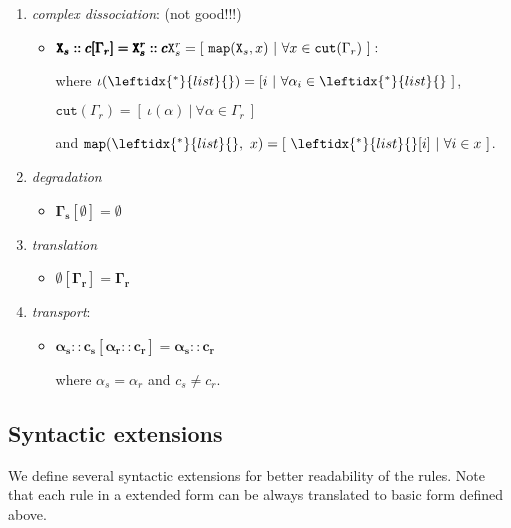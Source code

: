 \documentclass{entcs}
\renewcommand{\~}[0]{\texttildelow}
\begin{document}
\begin{definition}
\begin{enumerate}
\begin{itemize}
\end{itemize}

\item \textit{complex dissociation}: (not good!!!)

\begin{itemize}
\item $ \pmb{\mathtt{X}_s::c[\Gamma_r] = \mathtt{X}^r_s::c} \newline \mathtt{X}^r_s = [~\mathtt{map}(\mathtt{X}_s, x)~|~\forall x \in \mathtt{cut}(\Gamma_r)~]:$

where $\iota(\leftidx{^*}{list}{}) = [i~|~\forall \alpha_i \in \leftidx{^*}{list}{}~]$,

$\mathtt{cut}(\Gamma_r) = [~\iota(\alpha)~|~\forall \alpha \in \Gamma_r~]$

and $\mathtt{map}(\leftidx{^*}{list}{},~x) = [~\leftidx{^*}{list}{}[i]~|~\forall i \in x~] $.

\end{itemize}

\item \textit{degradation}
\begin{itemize}
\item $  \pmb{\Gamma_s[\emptyset] = \emptyset} $
\end{itemize}

\item \textit{translation}
\begin{itemize}
\item $ \pmb{\emptyset[\Gamma_r] = \Gamma_r} $
\end{itemize}

\item \textit{transport}:
\begin{itemize}
\item $ \pmb{\alpha_s::c_s[\alpha_r::c_r] = \alpha_s::c_r} $

where $\alpha_s = \alpha_r$ and $ c_s \neq c_r $.
\end{itemize}

\end{enumerate}
\end{definition}

\subsection{Syntactic extensions}

We define several syntactic extensions for better readability of the rules. Note that each rule in a extended form can be always translated to basic form defined above.
\end{document}
